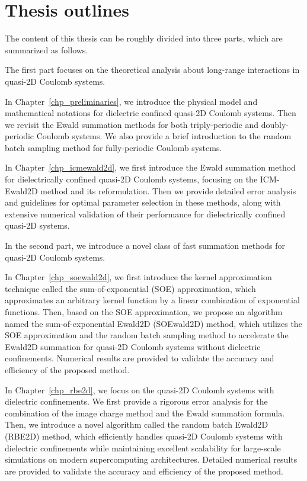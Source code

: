 \section{Thesis outlines}

The content of this thesis can be roughly divided into three parts, which are summarized as follows.

The first part focuses on the theoretical analysis about long-range interactions in quasi-2D Coulomb systems.

In Chapter~\ref{chp_preliminaries}, we introduce the physical model and mathematical notations for dielectric confined quasi-2D Coulomb systems.
Then we revisit the Ewald summation methods for both triply-periodic and doubly-periodic Coulomb systems.
We also provide a brief introduction to the random batch sampling method for fully-periodic Coulomb systems.

In Chapter~\ref{chp_icmewald2d}, we first introduce the Ewald summation method for dielectrically confined quasi-2D Coulomb systems, focusing on the ICM-Ewald2D method and its reformulation.
Then we provide detailed error analysis and guidelines for optimal parameter selection in these methods, along with extensive numerical validation of their performance for dielectrically confined quasi-2D systems.

In the second part, we introduce a novel class of fast summation methods for quasi-2D Coulomb systems.

In Chapter~\ref{chp_soewald2d}, we first introduce the kernel approximation technique called the sum-of-exponential (SOE) approximation, which approximates an arbitrary kernel function by a linear combination of exponential functions.
Then, based on the SOE approximation, we propose an algorithm named the sum-of-exponential Ewald2D (SOEwald2D) method, which utilizes the SOE approximation and the random batch sampling method to accelerate the Ewald2D summation for quasi-2D Coulomb systems without dielectric confinements.
Numerical results are provided to validate the accuracy and efficiency of the proposed method.

In Chapter~\ref{chp_rbe2d}, we focus on the quasi-2D Coulomb systems with dielectric confinements.
We first provide a rigorous error analysis for the combination of the image charge method and the Ewald summation formula.
Then, we introduce a novel algorithm called the random batch Ewald2D (RBE2D) method, which efficiently handles quasi-2D Coulomb systems with dielectric confinements while maintaining excellent scalability for large-scale simulations on modern supercomputing architectures.
Detailed numerical results are provided to validate the accuracy and efficiency of the proposed method.


